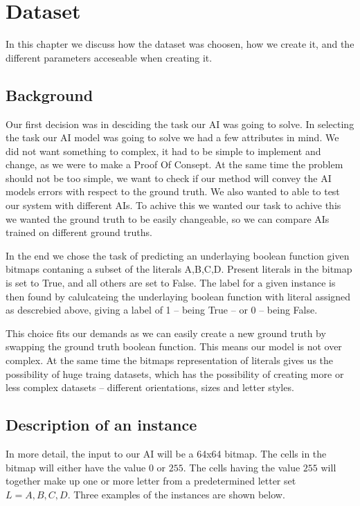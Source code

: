 \chapter{Dataset}
\label{DatasetChap}

In this chapter we discuss how the dataset was choosen, how we create it, and the different parameters 
acceseable when creating it. 

\section{Background}

Our first decision was in desciding the task our AI was going to solve.
In selecting the task our AI model was going to solve we had a few attributes in mind. We did not want something to complex,
it had to be simple to implement and change,  as we were to make a Proof Of Consept. At the same time the problem should not be too simple,
we want to check if our method will convey the AI models errors with respect to the ground truth.
We also wanted to able to test our system with different AIs. To achive this we wanted our task to achive this we wanted the ground truth
to be easily changeable, so we can compare AIs trained on different ground truths.

In the end we chose the task of predicting an underlaying boolean function given bitmaps contaning a subset of the literals {A,B,C,D}.
Present literals in the bitmap is set to True, and all others are set to False. The label for a given instance is 
then found by calulcateing the underlaying boolean function with literal assigned as descrebied above, giving a label of
1 – being True – or 0 – being False.

This choice fits our demands as we can easily create a new ground truth by swapping the ground truth boolean function. This means our model is not over complex. 
At the same time the bitmaps representation of literals gives us the possibility of huge traing datasets, which has the possibility of creating
more or less complex datasets – different orientations, sizes and letter styles. 

\section{Description of an instance}
\label{InstanceDescription}

In more detail, the input to our AI will be a 64x64 bitmap. The cells in the bitmap will either have the value $0$ or $255$.
The cells having the value $255$ will together make up one or more letter from a predetermined letter set $L = {A,B,C,D}$.
Three examples of the instances are shown below.
 
